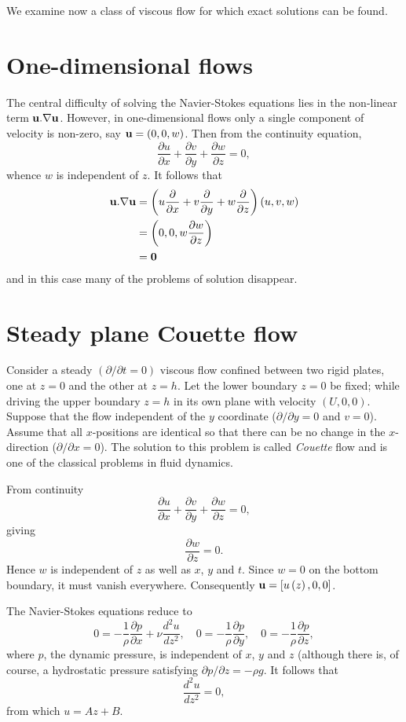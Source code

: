 \documentclass[10pt]{report}
\begin{document}
We examine now a class of viscous flow for which exact solutions can be
found.

\section{One-dimensional flows}
The central difficulty of solving the Navier-Stokes equations lies in the
non-linear term ${{\bf u}}. \nabla {{\bf u}}$. However, in
one-dimensional flows only a single component of velocity is non-zero, say
${{\bf u}}=\left( {0,0,w} \right)$. Then from the continuity equation,
\[
\frac{\partial u}{\partial x}+\frac{\partial v}{\partial
y}+\frac{\partial w}{\partial z}=0,
\]
whence $w$ is independent of $z$. It follows that
\begin{align*}
 {{\bf u}}. \nabla {{\bf u}}& =\left(
{u\frac{\partial }{\partial x}+v\frac{\partial }{\partial
y}+w\frac{\partial }{\partial z}} \right)(u,v,w) \\
&  =\left( {0,0,w\frac{\partial w}{\partial
z}} \right) \\
& ={{\bf 0}} \\
 \end{align*}
and in this case many of the problems of solution disappear.

\section{Steady plane Couette flow}
Consider a steady $(\partial /\partial t = 0)$ viscous flow confined
between two rigid plates, one at $z = 0$ and the other at $z = h$. Let the lower
boundary $z = 0$ be fixed; while driving the upper boundary $z = h$ in its own
plane with velocity $(U,0,0)$. Suppose that the flow independent of the $y$
coordinate ($\partial /\partial y = 0$ and $v = 0$). Assume that all
$x$-positions are identical so that there can be no change in the $x$-direction
($\partial /\partial x = 0$). The solution to this problem is called
\textit{Couette} flow and is one of the classical problems in fluid dynamics.

From continuity
\[\frac{\partial u}{\partial x}+\frac{\partial
v}{\partial y}+\frac{\partial w}{\partial z}=0, \]
giving
\[\frac{\partial w}{\partial z}=0.\]
Hence $w$ is independent of $z$ as well as $x$, $y$ and $t$. Since $w = 0$ on the bottom
boundary, it must vanish everywhere. Consequently ${{\bf u}}=\left[
{u\left( z \right),0,0} \right]$.

The Navier-Stokes equations reduce to
\[
0=-\frac{1}{\rho }\frac{\partial p}{\partial x}+\nu
\frac{d^2u}{dz^2},\quad 0=-\frac{1}{\rho }\frac{\partial
p}{\partial y},\quad 0=-\frac{1}{\rho }\frac{\partial
p}{\partial z},
\]
where $p$, the dynamic pressure, is independent of $x$, $y$ and $z$ (although there
is, of course, a hydrostatic pressure satisfying ${\partial p} /{\partial z}=-\rho g$. It follows that
\[
\frac{d^2u}{dz^2}=0,
\]
from which $u=Az+B$.
\end{document}
